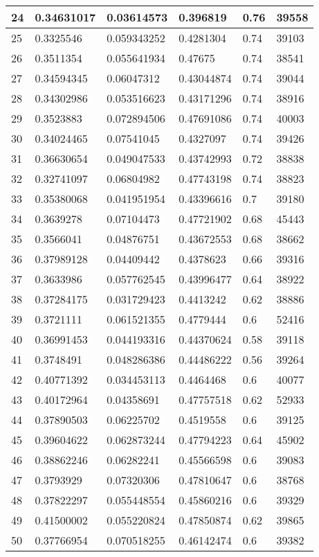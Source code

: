 \begin{longtable}{|l|l|l|l|l|l|}
24 & 0.34631017 & 0.03614573 & 0.396819 & 0.76 & 39558 \\ \hline 
25 & 0.3325546 & 0.059343252 & 0.4281304 & 0.74 & 39103 \\ \hline 
26 & 0.3511354 & 0.055641934 & 0.47675 & 0.74 & 38541 \\ \hline 
27 & 0.34594345 & 0.06047312 & 0.43044874 & 0.74 & 39044 \\ \hline 
28 & 0.34302986 & 0.053516623 & 0.43171296 & 0.74 & 38916 \\ \hline 
29 & 0.3523883 & 0.072894506 & 0.47691086 & 0.74 & 40003 \\ \hline 
30 & 0.34024465 & 0.07541045 & 0.4327097 & 0.74 & 39426 \\ \hline 
31 & 0.36630654 & 0.049047533 & 0.43742993 & 0.72 & 38838 \\ \hline 
32 & 0.32741097 & 0.06804982 & 0.47743198 & 0.74 & 38823 \\ \hline 
33 & 0.35380068 & 0.041951954 & 0.43396616 & 0.7 & 39180 \\ \hline 
34 & 0.3639278 & 0.07104473 & 0.47721902 & 0.68 & 45443 \\ \hline 
35 & 0.3566041 & 0.04876751 & 0.43672553 & 0.68 & 38662 \\ \hline 
36 & 0.37989128 & 0.04409442 & 0.4378623 & 0.66 & 39316 \\ \hline 
37 & 0.3633986 & 0.057762545 & 0.43996477 & 0.64 & 38922 \\ \hline 
38 & 0.37284175 & 0.031729423 & 0.4413242 & 0.62 & 38886 \\ \hline 
39 & 0.3721111 & 0.061521355 & 0.4779444 & 0.6 & 52416 \\ \hline 
40 & 0.36991453 & 0.044193316 & 0.44370624 & 0.58 & 39118 \\ \hline 
41 & 0.3748491 & 0.048286386 & 0.44486222 & 0.56 & 39264 \\ \hline 
42 & 0.40771392 & 0.034453113 & 0.4464468 & 0.6 & 40077 \\ \hline 
43 & 0.40172964 & 0.04358691 & 0.47757518 & 0.62 & 52933 \\ \hline 
44 & 0.37890503 & 0.06225702 & 0.4519558 & 0.6 & 39125 \\ \hline 
45 & 0.39604622 & 0.062873244 & 0.47794223 & 0.64 & 45902 \\ \hline 
46 & 0.38862246 & 0.06282241 & 0.45566598 & 0.6 & 39083 \\ \hline 
47 & 0.3793929 & 0.07320306 & 0.47810647 & 0.6 & 38768 \\ \hline 
48 & 0.37822297 & 0.055448554 & 0.45860216 & 0.6 & 39329 \\ \hline 
49 & 0.41500002 & 0.055220824 & 0.47850874 & 0.62 & 39865 \\ \hline 
50 & 0.37766954 & 0.070518255 & 0.46142474 & 0.6 & 39382 \\ \hline 
\end{longtable}
